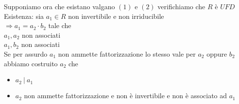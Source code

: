 \documentclass[12px]{article}
\begin{document}
\begin{dimo}
	     Supponiamo ora che esistano valgano  $(1)$ e $(2)$ verifichiamo che  $R$ è $UFD$\\
	     Esistenza: sia $a_1\in R$ non invertibile e non irriducibile\\
	     $ \Rightarrow a_1 = a_2\cdot b_2$ tale che \\
	     $a_1,a_2$ non associati\\
	     $a_1,b_2$ non associati\\
	     Se per assurdo $a_1$ non ammette fattorizzazione lo stesso vale per $a_2$ oppure $b_2$\\
abbiamo costruito $a_2$ che 
\begin{itemize}
	\item $a_2 \ |\ a_1$
	\item $a_2$ non ammette fattorizzazione e non è invertibile e non è associato ad $a_1$
\end{itemize}

\end{dimo}

	  
	
\end{document}

